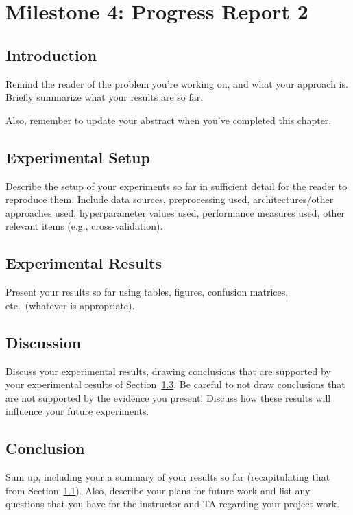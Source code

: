 \documentclass{report}
\begin{document}
\chapter{Milestone 4: Progress Report 2}


\section{Introduction}
\label{sec:M4-intro}

Remind the reader of the problem you're working on, and what your approach is.  Briefly summarize what your results are so far.

Also, remember to update your abstract when you've completed this chapter.

\section{Experimental Setup}
\label{sec:M3-setup}

Describe the setup of your experiments so far in sufficient detail for the reader to reproduce them.  Include data sources, preprocessing used, architectures/other approaches used, hyperparameter values used, performance measures used, other relevant items (e.g., cross-validation).

\section{Experimental Results}
\label{sec:M4-results}

Present your results so far using tables, figures, confusion matrices, etc.\ (whatever is appropriate). 

\section{Discussion}

Discuss your experimental results, drawing conclusions that are supported by your experimental results of Section~\ref{sec:M4-results}.  Be careful to not draw conclusions that are not supported by the evidence you present! Discuss how these results will influence your future experiments.

\section{Conclusion}

Sum up, including your a summary of your results so far (recapitulating that from Section~\ref{sec:M4-intro}).  Also, describe your plans for future work and list any questions that you have for the instructor and TA regarding your project work.
\end{document}
